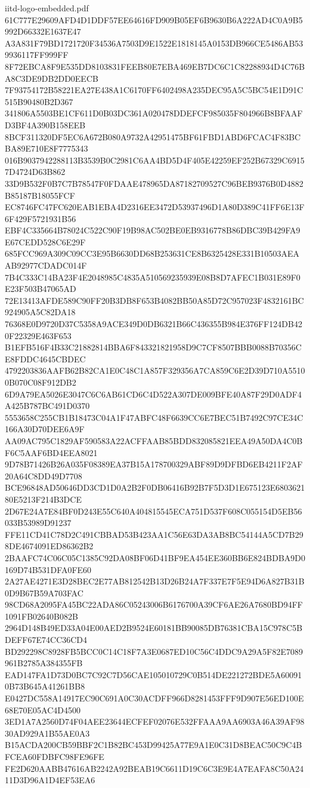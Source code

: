 \begin{filecontents*}[overwrite]{iitd-logo-embedded.pdf}
61C777E29609AFD4D1DDF57EE64616FD909B05EF6B9630B6A222AD4C0A9B5992D66332E1637E47
A3A831F79BD1721720F34536A7503D9E1522E1818145A0153DB966CE5486AB539936117FF999FF
8F72EBCA8F9E535DD8103831FEEB80E7EBA469EB7DC6C1C82288934D4C76BA8C3DE9DB2DD0EECB
7F93754172B58221EA27E438A1C6170FF6402498A235DEC95A5C5BC54E1D91C515B90480B2D367
341806A5503BE1CF611D0B03DC361A020478DDEFCF985035F804966B8BFAAFD3BF4A390B158EEB
8BCF311320DF5EC6A672B080A9732A42951475BF61FBD1ABD6FCAC4F83BCBA89E710E8F7775343
016B9037942288113B3539B0C2981C6AA4BD5D4F405E42259EF252B67329C69157D4724D63B862
33D9B532F0B7C7B78547F0FDAAE478965DA87182709527C96BEB9376B0D4882B85187B18055FCF
EC8746FC47FC620EAB1EBA4D2316EE3472D53937496D1A80D389C41FF6E13F6F429F5721931B56
EBF4C335664B78024C522C90F19B98AC502BE0EB9316778B86DBC39B429FA9E67CEDD528C6E29F
685FCC969A309C09CC3E95B6630DD68B253631CE8B6325428E331B10503AEAAB92977CDADC014F
7B4C333C14BA23F4E2048985C4835A510569235939E08B8D7AFEC1B031E89F0E23F503B47065AD
72E13413AFDE589C90FF20B3DB8F653B4082BB50A85D72C957023F4832161BC924905A5C82DA18
76368E0D9720D37C5358A9ACE349D0DB6321B66C436355B984E376FF124DB420F22329E463F653
B1EFB516F4B33C21882814BBA6F843321821958D9C7CF8507BBB0088B70356CE8FDDC4645CBDEC
4792203836AAFB62B82CA1E0C48C1A857F329356A7CA859C6E2D39D710A55100B070C08F912DB2
6D9A79EA5026E3047C6C6AB61CD6C4D522A307DE009BFE40A87F29D0ADF4A425B787BC491D0370
5553658C255CB1B18473C04A1F47ABFC48F6639CC6E7BEC51B7492C97CE34C166A30D70DEE6A9F
AA09AC795C1829AF590583A22ACFFAAB85BDD832085821EEA49A50DA4C0BF6C5AAF6BD4EEA8021
9D78B71426B26A035F08389EA37B15A178700329ABF89D9DFBD6EB4211F2AF20A64C8DD49D7708
BCE96848AD50646DD3CD1D0A2B2F0DB06416B92B7F5D3D1E675123E680362180E5213F214B3DCE
2D67E24A7E84BF0D243E55C640A404815545ECA751D537F608C055154D5EB56033B53989D91237
FFE11CD41C78D2C491CBBAD53B423AA1C56E63DA3AB8BC54144A5CD7B298DE4674091ED86362B2
2BAAFC74C06C05C1385C92DA08BF06D41BF9EA454EE360BB6E824BDBA9D0169D74B531DFA0FE60
2A27AE4271E3D28BEC2E77AB812542B13D26B24A7F337E7F5E94D6A827B31B0D9B67B59A703FAC
98CD68A2095FA45BC22ADA86C05243006B6176700A39CF6AE26A7680BD94FF1091FB02640B082B
2964D148B49ED33A04E00AED2B9524E60181BB90085DB76381CBA15C978C5BDEFF67E74CC36CD4
BD292298C8928FB5BCC0C14C18F7A3E0687ED10C56C4DDC9A29A5F82E7089961B2785A384355FB
EAD147FA1D73D0BC7C92C7D56CAE105010729C0B514DE221272BDE5A600910B73B645A41261BB8
E0427DC558A14917EC90C691A0C30ACDFF966D8281453FFF9D907E56ED100E68E70E05AC4D4500
3ED1A7A2560D74F04AEE23644ECFEF02076E532FFAAA9AA6903A46A39AF9830AD929A1B55AE0A3
B15ACDA200CB59BBF2C1B82BC453D99425A77E9A1E0C31D8BEAC50C9C4BFCEA60FDBFC98FE96FE
FE2D620AABB47616AB2242A92BEAB19C6611D19C6C3E9E4A7EAFA8C50A2411D3D96A1D4EF53EA6

\end{filecontents*}
